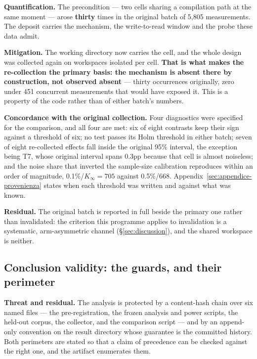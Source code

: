 \textbf{Quantification.} The precondition --- two cells sharing a compilation path at the same moment ---
arose \textbf{thirty} times in the original batch of 5{,}805 measurements. The deposit carries the
mechanism, the write-to-read window and the probe these data admit.

\textbf{Mitigation.} The working directory now carries the cell, and the whole design was collected again
on workspaces isolated per cell. \textbf{That is what makes the re-collection the primary basis: the
mechanism is absent there by construction, not observed absent} --- thirty occurrences originally, zero
under 451 concurrent measurements that would have exposed it. This is a property of the code rather than
of either batch's numbers.

\textbf{Concordance with the original collection.} Four diagnostics were specified for the comparison,
and all four are met: six of eight contrasts keep their sign against a threshold of six; no test passes
its Holm threshold in either batch; seven of eight re-collected effects fall inside the original 95\%
interval, the exception being T7, whose original interval spans 0.3pp because that cell is almost
noiseless; and the noise share that inverted the sample-size calibration reproduces within an order of
magnitude, 0.1\%/$K_\infty{=}705$ against 0.5\%/668. Appendix~\ref{sec:appendice-provenienza} states when
each threshold was written and against what was known.



\textbf{Residual.} The original batch is reported in full beside the primary one rather than invalidated:
the criterion this programme applies to invalidation is a systematic, arm-asymmetric channel
(\S\ref{sec:discussion}), and the shared workspace is neither.

\subsection{Conclusion validity: the guards, and their perimeter}

\textbf{Threat and residual.} The analysis is protected by a content-hash chain over six named files ---
the pre-registration, the frozen analysis and power scripts, the held-out corpus, the collector, and the
comparison script --- and by an append-only convention on the result directory whose guarantee is the
committed history. Both perimeters are stated so that a claim of precedence can be checked against the
right one, and the artifact enumerates them.

